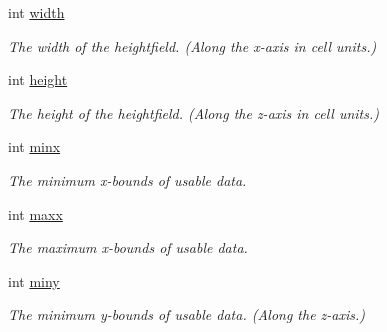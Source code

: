 \begin{DoxyCompactItemize}
\mbox{\label{structrcHeightfieldLayer_a6904f7a9539c4a5f88c2f134ac7b8649}} 
int \hyperlink{structrcHeightfieldLayer_a6904f7a9539c4a5f88c2f134ac7b8649}{width}
\begin{DoxyCompactList}\small\item\em The width of the heightfield. (Along the x-\/axis in cell units.) \end{DoxyCompactList}\item 
\mbox{\label{structrcHeightfieldLayer_a58d4448da1f29c63229a11ffc886b351}} 
int \hyperlink{structrcHeightfieldLayer_a58d4448da1f29c63229a11ffc886b351}{height}
\begin{DoxyCompactList}\small\item\em The height of the heightfield. (Along the z-\/axis in cell units.) \end{DoxyCompactList}\item 
\mbox{\label{structrcHeightfieldLayer_adcd87e9ea184d277f36eea61314f6f4a}} 
int \hyperlink{structrcHeightfieldLayer_adcd87e9ea184d277f36eea61314f6f4a}{minx}
\begin{DoxyCompactList}\small\item\em The minimum x-\/bounds of usable data. \end{DoxyCompactList}\item 
\mbox{\label{structrcHeightfieldLayer_ab0b3836202050d3a701d2e3cfba8d9ab}} 
int \hyperlink{structrcHeightfieldLayer_ab0b3836202050d3a701d2e3cfba8d9ab}{maxx}
\begin{DoxyCompactList}\small\item\em The maximum x-\/bounds of usable data. \end{DoxyCompactList}\item 
\mbox{\label{structrcHeightfieldLayer_af5df0f6946f89193ca1c3e5c6f9ab49b}} 
int \hyperlink{structrcHeightfieldLayer_af5df0f6946f89193ca1c3e5c6f9ab49b}{miny}
\begin{DoxyCompactList}\small\item\em The minimum y-\/bounds of usable data. (Along the z-\/axis.) \end{DoxyCompactList}\item 
\mbox{\label{structrcHeightfieldLayer_ad697fc4a8a65c2b1ef1f976097ee2b3f}} 

\end{DoxyCompactItemize}
